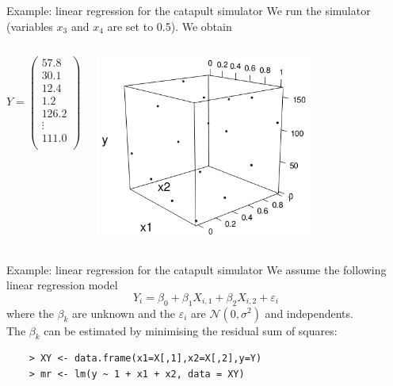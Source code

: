 \documentclass{beamer}
\begin{document}
\begin{frame}{}
\begin{exampleblock}{Example: linear regression for the catapult simulator}
We run the simulator (variables $x_3$ and $x_4$ are set to 0.5). We obtain
\begin{columns}[c]
\column{1cm}
\begin{equation*}
	Y =
	\begin{pmatrix}
		 57.8 \\
		 30.1 \\
		 12.4 \\
		  1.2 \\
		126.2 \\
		\vdots\\
		111.0\\
	\end{pmatrix} 
\end{equation*}
\column{5cm}
\begin{center}
\includegraphics[height=6cm]{figures/R/linReg_output.png}
\end{center}
\end{columns}
\end{exampleblock}
\end{frame}

\begin{frame}[fragile]{}
\begin{exampleblock}{Example: linear regression for the catapult simulator}
We assume the following linear regression model
$$Y_i = \beta_0 + \beta_1 X_{i,1} + \beta_2 X_{i,2} + \varepsilon_i$$
where the $\beta_k$ are unknown and the $\varepsilon_i$ are $\mathcal{N}(0,\sigma^2)$ and independents.\\
\vspace{5mm}
The $\beta_k$ can be estimated by minimising the residual sum of squares:
\begin{verbatim}
	> XY <- data.frame(x1=X[,1],x2=X[,2],y=Y)
	> mr <- lm(y ~ 1 + x1 + x2, data = XY)   
\end{verbatim}
\end{exampleblock}
\end{frame}
\end{document}
